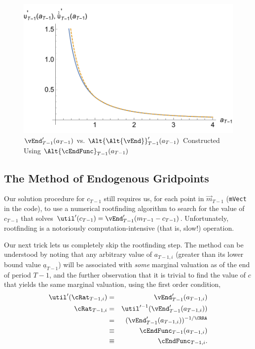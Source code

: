 \documentclass[titlepage]{\econtex}
\begin{document}
\hypertarget{GothVVSGothCInv}{}
\begin{figure}
        \includegraphics{./Figures/GothVVSGothCInv}
        \caption{$\vEnd_{T-1}^{\prime}({a}_{T-1})$ vs. $\Alt{\Alt{\vEnd}}_{T-1}^{\prime}({a}_{T-1})$ Constructed Using $\Alt{\cEndFunc}_{T-1}({a}_{T-1})$}
        \label{fig:GothVVSGothCInv}
\end{figure}



\hypertarget{The-Method-of-Endogenous-Gridpoints}{}
\subsection{The Method of Endogenous Gridpoints}

Our solution procedure for ${c}_{T-1}$ still requires us, for each
point in $\vec{m}_{T-1}$ (\texttt{mVect} in the code), to use a
numerical rootfinding algorithm to search for the value of ${c}_{T-1}$
that solves $\util^{\prime}({c}_{T-1}) =
\vEnd_{T-1}^{\prime}({m}_{T-1}-{c}_{T-1})$.  Unfortunately, rootfinding
is a notoriously computation-intensive (that is, slow!) operation.

Our next trick lets us completely skip the rootfinding step.  The method can be understood by noting that
any arbitrary value of ${a}_{T-1,i}$ (greater than its lower bound
value $\underline{a}_{T-1}$) will be associated with \textit{some}
marginal valuation as of the end of period $T-1$, and the further
observation that it is trivial to find the value of ${c}$ that yields
the same marginal valuation, using the first order condition,
\begin{eqnarray}
\util^{\prime}({\cRat}_{T-1,i})  & =  &
\vEnd^{\prime}_{T-1}({a}_{T-1,i}) \label{eq:eulerTm1}
\\ {\cRat}_{T-1,i} & = & \util^{\prime-1}(\vEnd^{\prime}_{T-1}({a}_{T-1,i}))
\\ & = & (\vEnd^{\prime}_{T-1}({a}_{T-1,i}))^{-1/\CRRA}
\\ & \equiv & \cEndFunc_{T-1}({a}_{T-1,i})
\\ & \equiv & \cEndFunc_{T-1,i}
.
\end{eqnarray}
\end{document}
